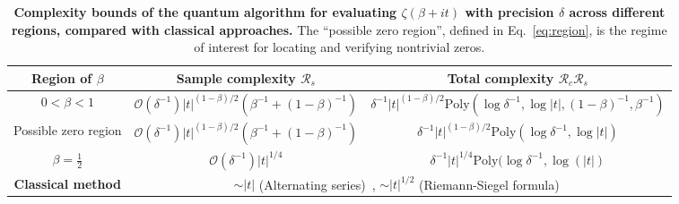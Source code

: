 \documentclass[aps,pra,twocolumn,superscriptaddress,preprintnumbers,amsmath,amssymb]{revtex4-2}
\begin{document}
\begin{table}[htbp!]
\centering
\renewcommand{\arraystretch}{1.9}
\begin{tabular}{|c|c|c|}
\hline
\textbf{Region of $\beta$} & \textbf{Sample complexity $\mathcal{R}_s$} & \textbf{Total complexity} $\mathcal{R}_c\mathcal{R}_s$ \\
\hline
$0<\beta<1$ & 
$\mathcal{O}(\delta^{-1})|t|^{(1-\beta)/2}(\beta^{-1}+(1-\beta)^{-1})$& 
$    \delta^{-1}|t|^{(1-\beta)/2}
    \mathrm{Poly}(\log \delta^{-1},\log |t|,(1-\beta)^{-1},\beta^{-1})$ \\
\hline
Possible zero region& 
$\mathcal{O}(\delta^{-1})|t|^{(1-\beta)/2}(\beta^{-1}+(1-\beta)^{-1})$ & 
$    \delta^{-1}|t|^{(1-\beta)/2}
    \mathrm{Poly}(\log \delta^{-1},\log |t|)$ \\
\hline
$\beta=\tfrac{1}{2}$& 
$\mathcal{O}(\delta^{-1})|t|^{1/4}$ & 
$    \delta^{-1}|t|^{1/4}
    \mathrm{Poly}(\log \delta^{-1},\log( |t|)$ \\
\hline
\textbf{Classical method} & \multicolumn{2}{c|}{$\sim|t|$ (Alternating series)~\cite{borwein2000efficient}, $\sim|t|^{1/2}$ (Riemann-Siegel formula)~\cite{de2011high}}\\%
\hline
\end{tabular}
\caption{\textbf{Complexity bounds of the quantum algorithm for evaluating $\zeta(\beta+it)$ with precision $\delta$ across different regions, compared with classical approaches.} The ``possible zero region'', defined in Eq.~\eqref{eq:region}, is the  regime of interest for locating and verifying nontrivial zeros.}
\label{tab:complexity}
\end{table}
\end{document}
